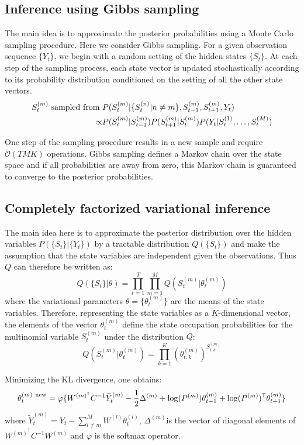 \documentclass{article}
\begin{document}
\subsection{Inference using Gibbs sampling}

The main idea is to approximate the posterior probabilities using a Monte Carlo sampling procedure. Here we consider Gibbs sampling. For a given observation sequence $\{Y_t\}$, we begin with a random setting of the hidden states $\{S_t\}$. At each step of the sampling process, each state vector is updated stochastically according to its probability distribution conditioned on the setting of all the other state vectors.
\begin{align*}
S_t^{(m)} \textnormal{ sampled from } & P(S_t^{(m)} | \{S_t^{(n)} | n \ne m \}, S_{t-1}^{(m)}, S_{t+1}^{(m)}, Y_t) \\
\propto & P(S_t^{(m)} | S_{t-1}^{(m)}) P(S_{t+1}^{(m)} | S_{t}^{(m)}) P(Y_t | S_{t}^{(1)}, \dots, S_{t}^{(M)})
\end{align*}

One step of the sampling procedure results in a new sample and require $\mathcal{O}(TMK)$ operations. Gibbs sampling defines a Markov chain over the state space and if all probabilities are away from zero, this Markov chain is guaranteed to converge to the posterior probabilities.

\subsection{Completely factorized variational inference}

The main idea here is to approximate the posterior distribution over the hidden variables $P(\{S_t\}|\{Y_t\})$ by a tractable distribution $Q(\{S_t\})$ and make the assumption that the state variables are independent given the observations. Thus $Q$ can therefore be written as:
\[ Q(\{S_t\}|\theta) = \prod_{t=1}^T \prod_{m=1}^M Q(S_t^{(m)}|\theta_t^{(m)}) \]
where the variational parameters $\theta = \{ \theta_t^{(m)} \}$ are the means of the state variables. Therefore, representing the state variables as a $K$-dimensional vector, the elements of the vector $\theta_t^{(m)}$ define the state occupation probabilities for the multinomial variable $S_t^{(m)}$ under the distribution $Q$:
\[ Q(S_t^{(m)}|\theta_t^{(m)}) = \prod_{k=1}^K \left( \theta_{t,k}^{(m)} \right)^{S_{t,k}^{(m)}} \]

Minimizing the KL divergence, one obtains:
\begin{equation}
\theta_t^{(m) \ \textnormal{new}} = \varphi\{ W^{(m)^\mathsf{T}} C^{-1} \widetilde{Y}_t^{(m)} - \frac{1}{2} \Delta^{(m)} + \log(P^{(m)}) \theta_{t-1}^{(m)} + \log(P^{(m)})^\mathsf{T} \theta_{t+1}^{(m)} \}
\end{equation}
where $\widetilde{Y}_t^{(m)} = Y_t - \sum_{l \ne m}^M W^{(l)} \theta_t^{(l)}$, $\Delta^{(m)}$is the vector of diagonal elements of $W^{(m)^\mathsf{T}} C^{-1} W^{(m)}$ and $\varphi$ is the softmax operator.
\end{document}

